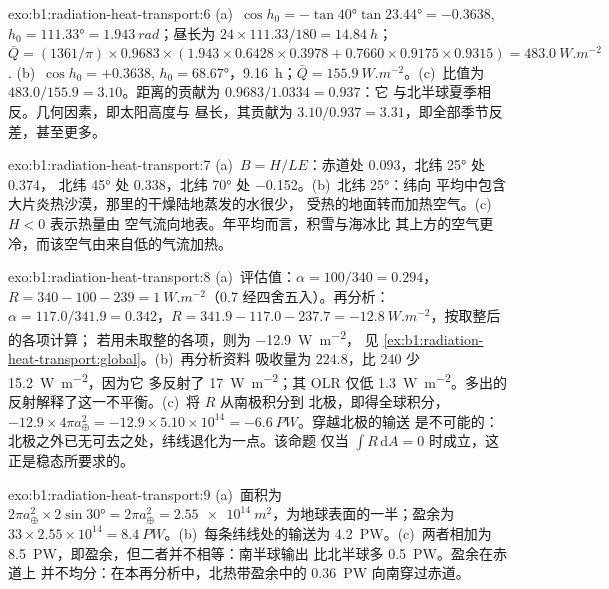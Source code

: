 \begin{solution}{exo:b1:radiation-heat-transport:6}
(a)~$\cos h_0 = -\tan\ang{40}\tan\ang{23.44} = -0.3638$, $h_0 = \ang{111.33} =
\qty{1.943}{rad}$；昼长为 $24 \times 111.33/180 = \qty{14.84}{h}$；$\bar Q =
(1361/\pi) \times 0.9683 \times (1.943 \times 0.6428 \times 0.3978 + 0.7660 \times
0.9175 \times 0.9315) = \qty{483.0}{W.m^{-2}}$. (b)~$\cos h_0 = +0.3638$, $h_0 =
\ang{68.67}$，\qty{9.16}{h}；$\bar Q = \qty{155.9}{W.m^{-2}}$。(c)~比值为
$483.0/155.9 = 3.10$。距离的贡献为 $0.9683/1.0334 = 0.937$：它
与北半球夏季相反。几何因素，即太阳高度与
昼长，其贡献为 $3.10/0.937 = 3.31$，即全部季节反差，甚至更多。
\end{solution}

\begin{solution}{exo:b1:radiation-heat-transport:7}
(a)~$B = H/LE$：赤道处 \num{0.093}，北纬 \ang{25} 处 \num{0.374}，
北纬 \ang{45} 处 \num{0.338}，北纬 \ang{70} 处 \num{-0.152}。(b)~北纬 \ang{25}：纬向
平均中包含大片炎热沙漠，那里的干燥陆地蒸发的水很少，
受热的地面转而加热空气。(c)~$H < 0$ 表示热量由
空气流向地表。年平均而言，积雪与海冰比
其上方的空气更冷，而该空气由来自低的气流加热。
\end{solution}

\begin{solution}{exo:b1:radiation-heat-transport:8}
(a)~评估值：$\alpha = 100/340 = 0.294$，$R = 340 - 100 - 239 =
\qty{+1}{W.m^{-2}}$（\num{0.7} 经四舍五入）。再分析：$\alpha = 117.0/341.9 =
0.342$，$R = 341.9 - 117.0 - 237.7 = \qty{-12.8}{W.m^{-2}}$，按取整后的各项计算；
若用未取整的各项，则为 \qty{-12.9}{W.m^{-2}}，
见 \cref{ex:b1:radiation-heat-transport:global}。(b)~再分析资料
吸收量为 $224.8$，比 $240$ 少 \qty{15.2}{W.m^{-2}}，因为它
多反射了 \qty{17}{W.m^{-2}}；其 OLR 仅低 \qty{1.3}{W.m^{-2}}。多出的
反射解释了这一不平衡。(c)~将 $R$ 从南极积分到
北极，即得全球积分，$-12.9 \times 4\pi a_\oplus^2 = -12.9 \times
5.10\times10^{14} = \qty{-6.6}{PW}$。穿越北极的输送
是不可能的：北极之外已无可去之处，纬线退化为一点。该命题
仅当 $\int R\,\mathrm dA = 0$ 时成立，这正是稳态所要求的。
\end{solution}

\begin{solution}{exo:b1:radiation-heat-transport:9}
(a)~面积为 $2\pi a_\oplus^2 \times 2\sin\ang{30} = 2\pi a_\oplus^2 =
\qty{2.55e14}{m^2}$，为地球表面的一半；盈余为 $33 \times 2.55\times10^{14} =
\qty{8.4}{PW}$。(b)~每条纬线处的输送为 \qty{4.2}{PW}。(c)~两者相加为
\qty{8.5}{PW}，即盈余，但二者并不相等：南半球输出
比北半球多 \qty{0.5}{PW}。盈余在赤道上
并不均分：在本再分析中，北热带盈余中的 \qty{0.36}{PW}
向南穿过赤道。
\end{solution}


